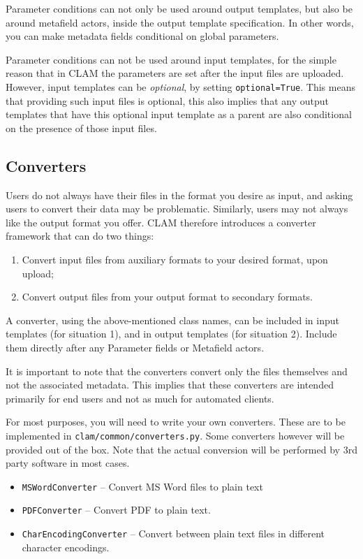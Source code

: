 \documentclass[a4paper,12pt]{report}
\begin{document}
Parameter conditions can not only be used around output templates, but also be
around metafield actors, inside the output template specification. In other
words, you can make metadata fields conditional on global parameters.

Parameter conditions can not be used around input templates, for the simple
reason that in CLAM the parameters are set after the input files are uploaded.
However, input templates can be \emph{optional}, by setting
\texttt{optional=True}. This means that providing such input files is optional,
this also implies that any output templates that have this optional input
template as a parent are also conditional on the presence of those input files.


\subsection{Converters}

Users do not always have their files in the format you desire as input, and
asking users to convert their data may be problematic. Similarly, users may not
always like the output format you offer. CLAM therefore introduces a converter
framework that can do two things:

\begin{enumerate}
\item Convert input files from auxiliary formats to your desired format, upon upload;
\item Convert output files from your output format to secondary formats.
\end{enumerate}

A converter, using the above-mentioned class names, can be included in input
templates (for situation 1), and in output templates (for situation 2). Include
them directly after any Parameter fields or Metafield actors.

It is important to note that the converters convert only the files themselves
and not the associated metadata. This implies that these converters are
intended primarily for end users and not as much for automated clients.

For most purposes, you will need to write your own converters. These are to be
implemented in \texttt{clam/common/converters.py}. Some converters however will
be provided out of the box. Note that the actual conversion will be performed
by 3rd party software in most cases.

\begin{itemize}
\item \texttt{MSWordConverter} -- Convert MS Word files to plain text
\item \texttt{PDFConverter} -- Convert PDF to plain text.
\item \texttt{CharEncodingConverter} -- Convert between plain text files in different character encodings.
\end{itemize}
\end{document}
